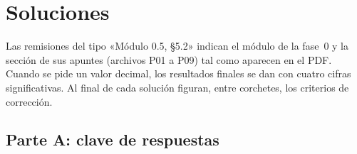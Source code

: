 \chapter{Soluciones}
\label{ap:soluciones}

Las remisiones del tipo «Módulo 0.5, §5.2» indican el módulo de la fase~0 y la sección de sus apuntes (archivos P01 a P09) tal como aparecen en el PDF. Cuando se pide un valor decimal, los resultados finales se dan con cuatro cifras significativas. Al final de cada solución figuran, entre corchetes, los criterios de corrección.

\section{Parte A: clave de respuestas}

